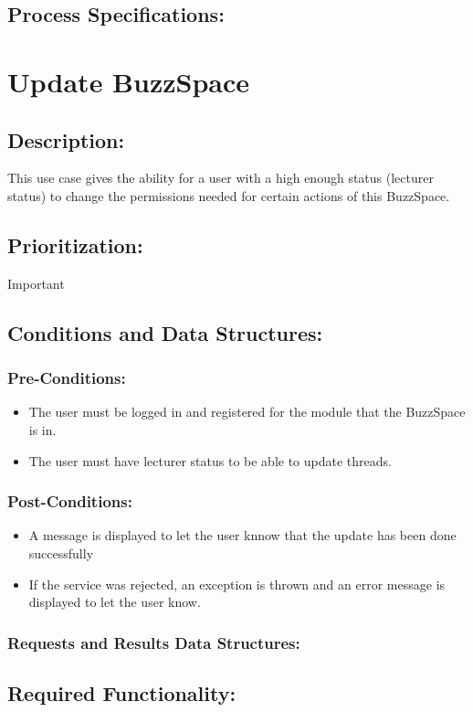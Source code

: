 \documentclass[a4paper,11pt]{article}
\begin{document}
\subsection{Process Specifications:} 

\section{Update BuzzSpace}
\subsection*{Description:}This use case gives the ability for a user with a high enough status (lecturer status) to change the permissions needed for certain actions of this BuzzSpace. 
\subsection{Prioritization:} Important
\subsection{Conditions and Data Structures:}
\subsubsection*{Pre-Conditions:}
\begin{itemize}
	\item The user must be logged in and registered for the module that the BuzzSpace is in.
	\item The user must have lecturer status to be able to update threads.
\end{itemize}
\subsubsection*{Post-Conditions:}
\begin{itemize}
	\item A message is displayed to let the user knnow that the update has been done successfully
	\item If the service was rejected, an exception is thrown and an error message is displayed to let the user know.
\end{itemize}
\subsubsection*{Requests and Results Data Structures:}
\subsection{Required Functionality:} 
\end{document}
